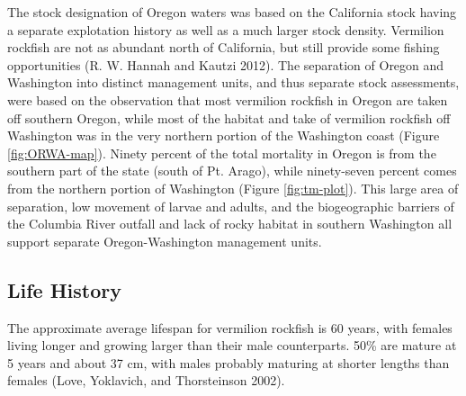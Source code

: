 \documentclass[11pt,
  english,
  a4paper,
]{article}
\begin{document}
\leavevmode\tagmcend\tagstructend\par


The stock designation of Oregon waters was based on the California stock having a separate explotation history as well as a much larger stock density. Vermilion rockfish are not as abundant north of California, but still provide some fishing opportunities {(R. W. Hannah and Kautzi 2012)\leavevmode\tagmcend\tagstructend}. The separation of Oregon and Washington into distinct management units, and thus separate stock assessments, were based on the observation that most vermilion rockfish in Oregon are taken off southern Oregon, while most of the habitat and take of vermilion rockfish off Washington was in the very northern portion of the Washington coast (Figure \ref{fig:ORWA-map}). Ninety percent of the total mortality in Oregon is from the southern part of the state (south of Pt. Arago), while ninety-seven percent comes from the northern portion of Washington (Figure \ref{fig:tm-plot}). This large area of separation, low movement of larvae and adults, and the biogeographic barriers of the Columbia River outfall and lack of rocky habitat in southern Washington all support separate Oregon-Washington management units.

\leavevmode\tagmcend\tagstructend\par


\hypertarget{life-history}{%
\subsection{Life History}\label{life-history}}

\leavevmode\tagmcend\tagstructend


The approximate average lifespan for vermilion rockfish is 60 years, with females living longer and growing larger than their male counterparts. 50\% are mature at 5 years and about 37 cm, with males probably maturing at shorter lengths than females {(Love, Yoklavich, and Thorsteinson 2002)\leavevmode\tagmcend\tagstructend}.

\leavevmode\tagmcend\tagstructend\par
\end{document}
